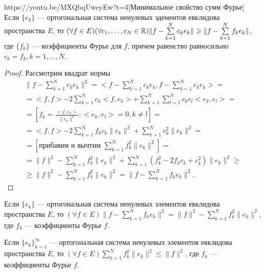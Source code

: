 \begin{linkthm}{https://youtu.be/MXQbqUweyEw?t=4}[Минимальное свойство сумм Фурье]\ \\
	Если $\{e_k\}$ --- ортогональная система ненулевых эдементов евклидова пространства $E$, то $(\forall f\in E)(\forall c_1,\ldots, c_N \in \mathbb{R})\|f-\sum\limits_{k=1}^N c_k e_k\|\geqslant \|f-\sum\limits_{k=1}^N f_ke_k\|$, где $\{f_k\}$ --- коэффициенты Фурье для $f$, причем равенство равносильно $c_k=f_k, k=1,\ldots, N$.
\end{linkthm}
\begin{proof} Рассмотрим квадрат нормы
\begin{multline*}
\|f-\sum\limits_{k=1}^N c_ke_k\|^2=<f-\sum\limits_{k=1}^Nc_ke_k, f-\sum\limits_{k=1}^Nc_ke_k>=\\=<f,f>-2\sum\limits_{k=1}^Nc_k<f,e_k>+\sum\limits_{k=1}^N\sum\limits_{l=1}^N c_kc_l<e_k,e_l>=\\=\left[f_k=\frac{<f,e_k>}{\|e_k\|^2}; <e_k,e_l>=0, k\ne l\right]=\\=<f,f>-2\sum\limits_{k=1}^Nf_kc_k\|e_k\|^2+\sum\limits_{k=1}^Nc_k^2\|e_k\|^2=\\=\left[\text{прибавим и вычтим } \sum\limits_{k=1}^Nf_k^2\|e_k\|^2\right]=\\=\|f\|^2-\sum\limits_{k=1}^Nf_k^2\|e_k\|^2+\sum\limits_{k=1}^N(f_k^2-2f_kc_k+c_k^2)\|e_k\|^2\geqslant \\ \geqslant \|f\|^2-\sum\limits_{k=1}^Nf_k^2\|e_k\|^2=\|f-\sum\limits_{k=1}^Nf_ke_k\|^2.
\end{multline*}
\end{proof}

\begin{corollary}
	Если $\{e_k\}$ --- ортогональная система ненулевых элементов евклидова  пространства $E$, то $(\forall f\in E) \|f-\sum\limits_{k=1}^N f_ke_k\|^2=\|f\|^2-\sum\limits_{k=1}^N f_k^2\|e_k\|^2$, где $f_k$ --- коэффициенты Фурье $f$.
\end{corollary}

\begin{corollary}
	Если $\{e_k\}_{k=1}^\infty$ --- ортогональная система ненулевых элементов евклидова  пространства $E$, то $(\forall f\in E) \sum\limits_{k=1}^N f_k^2\|e_k\|^2\leqslant \|f\|^2$, где $f_k$ --- коэффициенты Фурье $f$.
\end{corollary}

